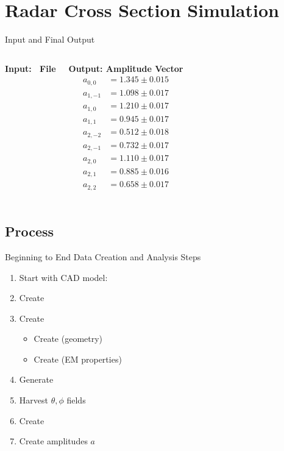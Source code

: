 % 

\section{Radar Cross Section Simulation}

\begin{frame}{Input and Final Output}
    \begin{columns}[T] %
        \textbf{Input: \obj \ File}
        \lstset{style=obj}

        \textbf{Output: Amplitude Vector}
        \[
        \begin{aligned}
        a_{0,0}  &= 1.345 \pm 0.015 \\
        a_{1,-1} &= 1.098 \pm 0.017 \\
        a_{1,0}  &= 1.210 \pm 0.017 \\
        a_{1,1}  &= 0.945 \pm 0.017 \\
        a_{2,-2} &= 0.512 \pm 0.018 \\
        a_{2,-1} &= 0.732 \pm 0.017 \\
        a_{2,0}  &= 1.110 \pm 0.017 \\
        a_{2,1}  &= 0.885 \pm 0.016 \\
        a_{2,2}  &= 0.658 \pm 0.017 \\
        \end{aligned}
        \]
    \end{columns}
\end{frame}


\subsection{Process}
\begin{frame}[ allowframebreaks ]{Beginning to End}
Data Creation and Analysis Steps
\begin{enumerate}
	\item Start with CAD model: \stl
	\item Create \obj
	\item Create \bl{\facet}
		\begin{itemize}
			\item Create  (geometry)
			\item Create  (EM properties)
		\end{itemize}
	\item Generate 
	\item Harvest $\theta, \phi$ fields
	\item Create 
	\item Create amplitudes $a$
\end{enumerate}
\end{frame}

